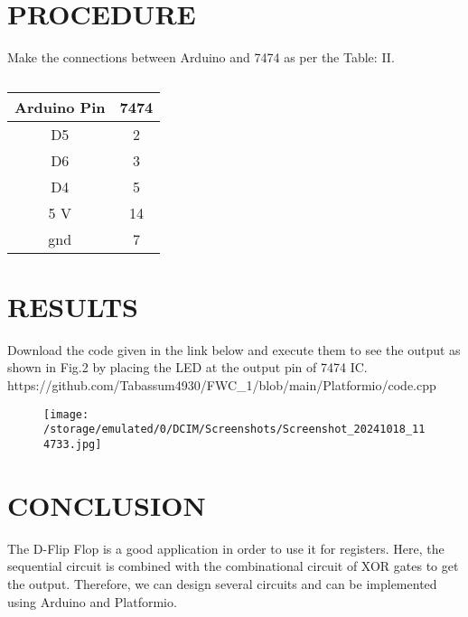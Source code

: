 \documentclass[conference]{IEEEtran}
\begin{document}
\section{PROCEDURE}
Make the connections between Arduino and 7474 as per the Table: II.
 \begin{table}[htbp]                                       
\centering                                                          
\begin{tabular}{| c | c |} \hline                                
	\textbf{Arduino Pin} & \textbf{7474}  \\\hline 
D5 & 2  \\ \hline                                             
D6 &  3 \\ \hline                                               
D4 & 5 \\ \hline                                           
5 V  & 14 \\ \hline                                        
gnd  & 7 \\                                                   
\hline                                                               
\end{tabular}                                                        
\vspace{0.1cm}                                                       
\caption{\label{tab:widgets}}                                       
\end{table}
\section{RESULTS}
Download the code given in the link below and execute them to see the output as shown in Fig.2 by placing the LED at the output pin of 7474 IC. 
\\ https://github.com/Tabassum4930/FWC\_1/blob/main/Platformio/code.cpp
\begin{figure}[h] 
	\centering 
	\texttt{[image: /storage/emulated/0/DCIM/Screenshots/Screenshot\_20241018\_114733.jpg]}
	\caption{\label{fig:Gates}}    
\end{figure}
\section{CONCLUSION}
The D-Flip Flop is a good application in order to use it for registers. Here, the sequential circuit is combined with the combinational circuit of XOR gates to get the output. Therefore, we can design several circuits and can be implemented using Arduino and Platformio.
\end{document}
